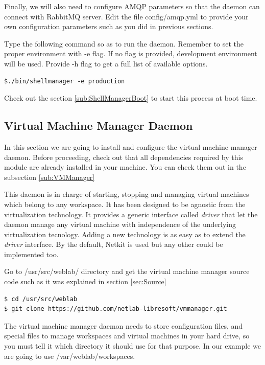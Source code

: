 \documentclass{article}
\begin{document}
Finally, we will also need to configure AMQP parameters so that the daemon can connect with RabbitMQ server. Edit the file config/amqp.yml to provide your own configuration parameters such as you did in previous sections.

Type the following command so as to run the daemon. Remember to set the proper environment with -e flag. If no flag is provided, development environment will be used. Provide -h flag to get a full list of available options.

\begin{verbatim}
$./bin/shellmanager -e production
\end{verbatim}

Check out the section \ref{sub:ShellManagerBoot} to start this process at boot time.

\subsection{Virtual Machine Manager Daemon}
In this section we are going to install and configure the virtual machine manager daemon. Before proceeding, check out that all dependencies required by this module are already installed in your machine. You can check them out in the subsection \ref{sub:VMManager}

This daemon is in charge of starting, stopping and managing virtual machines which belong to any workspace. It has been designed to be agnostic from the virtualization technology. It provides a generic interface called \textit{driver} that let the daemon manage any virtual machine with independence of the underlying virtualization tecnology. Adding a new technology is as easy as to extend the \textit{driver} interface. By the default, Netkit is used but any other could be implemented too.

Go to /usr/src/weblab/ directory and get the virtual machine manager source code such as it was explained in section \ref{sec:Source}

\begin{verbatim}
$ cd /usr/src/weblab
$ git clone https://github.com/netlab-libresoft/vmmanager.git
\end{verbatim}

The virtual machine manager daemon needs to store configuration files, and special files to manage workspaces and virtual machines in your hard drive, so you must tell it which directory it should use for that purpose. In our example we are going to use /var/weblab/workspaces.
\end{document}
